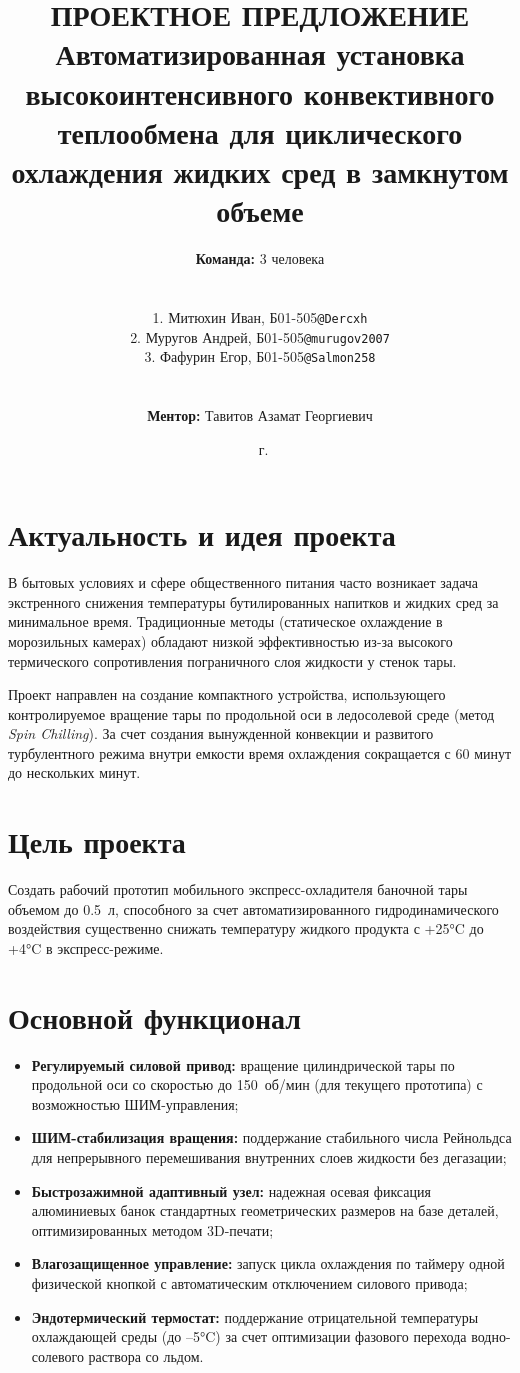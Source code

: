 \documentclass[a4paper,12pt]{article}
\title{\textbf{ПРОЕКТНОЕ ПРЕДЛОЖЕНИЕ}\\
\large Автоматизированная установка высокоинтенсивного конвективного теплообмена для циклического охлаждения жидких сред в замкнутом объеме}
\author{
    \textbf{Команда:} 3 человека \\\\
    \begin{tabular}{ll}
        1. Митюхин Иван, Б01-505 & \texttt{@Dercxh} \\
        2. Муругов Андрей, Б01-505 & \texttt{@murugov2007} \\
        3. Фафурин Егор, Б01-505 & \texttt{@Salmon258} \\
    \end{tabular} \\\\
    \textbf{Ментор:} Тавитов Азамат Георгиевич
}
\date{\the\year~г.}
\begin{document}
\maketitle

\section{Актуальность и идея проекта}
В бытовых условиях и сфере общественного питания часто возникает задача экстренного снижения температуры бутилированных напитков и жидких сред за минимальное время. Традиционные методы (статическое охлаждение в морозильных камерах) обладают низкой эффективностью из-за высокого термического сопротивления пограничного слоя жидкости у стенок тары. 

Проект направлен на создание компактного устройства, использующего контролируемое вращение тары по продольной оси в ледосолевой среде (метод \textit{Spin Chilling}). За счет создания вынужденной конвекции и развитого турбулентного режима внутри емкости время охлаждения сокращается с 60 минут до нескольких минут.

\section{Цель проекта}
Создать рабочий прототип мобильного экспресс-охладителя баночной тары объемом до 0.5~л, способного за счет автоматизированного гидродинамического воздействия существенно снижать температуру жидкого продукта с +25°C до +4°C в экспресс-режиме.

\section{Основной функционал}
\begin{itemize}
    \item \textbf{Регулируемый силовой привод:} вращение цилиндрической тары по продольной оси со скоростью до 150~об/мин (для текущего прототипа) с возможностью ШИМ-управления;
    \item \textbf{ШИМ-стабилизация вращения:} поддержание стабильного числа Рейнольдса для непрерывного перемешивания внутренних слоев жидкости без дегазации;
    \item \textbf{Быстрозажимной адаптивный узел:} надежная осевая фиксация алюминиевых банок стандартных геометрических размеров на базе деталей, оптимизированных методом 3D-печати;
    \item \textbf{Влагозащищенное управление:} запуск цикла охлаждения по таймеру одной физической кнопкой с автоматическим отключением силового привода;
    \item \textbf{Эндотермический термостат:} поддержание отрицательной температуры охлаждающей среды (до --5°C) за счет оптимизации фазового перехода водно-солевого раствора со льдом.
\end{itemize}
\end{document}
